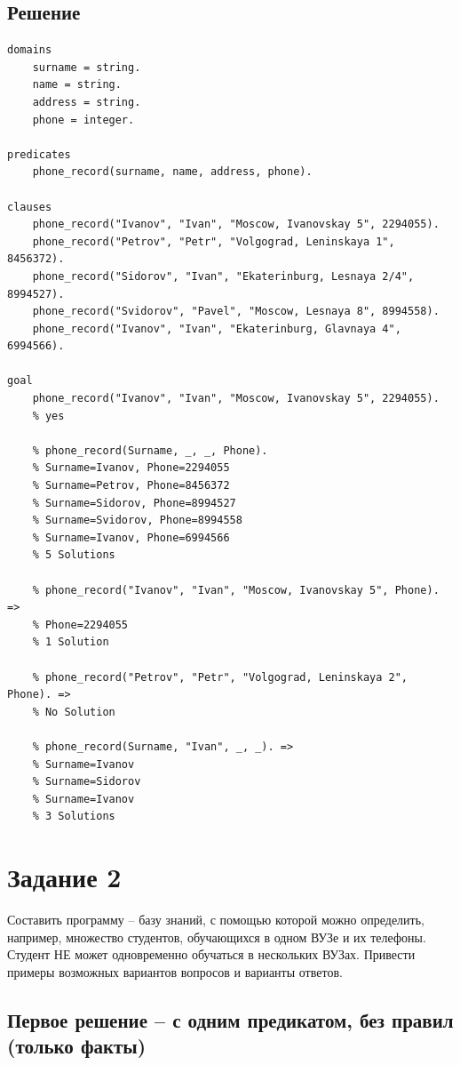 \documentclass[12pt]{report}
\begin{document}
\subsection*{Решение}
\begin{lstlisting}
domains
	surname = string.
	name = string.
	address = string.
	phone = integer.

predicates
	phone_record(surname, name, address, phone).

clauses
	phone_record("Ivanov", "Ivan", "Moscow, Ivanovskay 5", 2294055).
	phone_record("Petrov", "Petr", "Volgograd, Leninskaya 1", 8456372).
	phone_record("Sidorov", "Ivan", "Ekaterinburg, Lesnaya 2/4", 8994527).
	phone_record("Svidorov", "Pavel", "Moscow, Lesnaya 8", 8994558).
	phone_record("Ivanov", "Ivan", "Ekaterinburg, Glavnaya 4", 6994566).

goal
	phone_record("Ivanov", "Ivan", "Moscow, Ivanovskay 5", 2294055).
	% yes

	% phone_record(Surname, _, _, Phone). 
	% Surname=Ivanov, Phone=2294055
	% Surname=Petrov, Phone=8456372
	% Surname=Sidorov, Phone=8994527
	% Surname=Svidorov, Phone=8994558
	% Surname=Ivanov, Phone=6994566
	% 5 Solutions
	
	% phone_record("Ivanov", "Ivan", "Moscow, Ivanovskay 5", Phone). => 
	% Phone=2294055
	% 1 Solution
	
	% phone_record("Petrov", "Petr", "Volgograd, Leninskaya 2", Phone). =>
	% No Solution
	
	% phone_record(Surname, "Ivan", _, _). =>
	% Surname=Ivanov
	% Surname=Sidorov
	% Surname=Ivanov
	% 3 Solutions
\end{lstlisting}

\section*{Задание 2}

Составить программу – базу знаний, с помощью которой можно определить, например, множество студентов, обучающихся в одном ВУЗе и их телефоны. Студент НЕ может одновременно обучаться в нескольких ВУЗах. Привести примеры возможных вариантов  вопросов и варианты ответов.


\subsection*{Первое решение -- с одним предикатом, без правил (только факты)}
\end{document}
